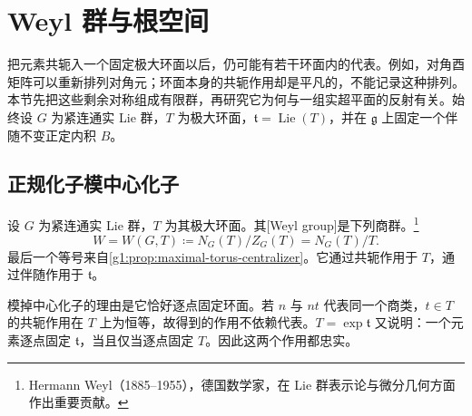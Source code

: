 
% 
% 

\section{Weyl 群与根空间}
\label{g1:sec:1904}

把元素共轭入一个固定极大环面以后，仍可能有若干环面内的代表。例如，对角酉矩阵可以重新排列对角元；环面本身的共轭作用却是平凡的，不能记录这种排列。本节先把这些剩余对称组成有限群，再研究它为何与一组实超平面的反射有关。始终设 \(G\) 为紧连通实 Lie 群，\(T\) 为极大环面，\(\mathfrak t=\operatorname{Lie}(T)\)，并在 \(\mathfrak g\) 上固定一个伴随不变正定内积 \(B\)。

\subsection{正规化子模中心化子}
\label{g1:subsec:1904:01}
\begin{definition}\label{g1:def:weyl-group}
	设 \(G\) 为紧连通实 Lie 群，\(T\) 为其极大环面。其[Weyl group]是下列商群。\footnote{Hermann Weyl（1885--1955），德国数学家，在 Lie 群表示论与微分几何方面作出重要贡献。}
	\[
		W=W(G,T)\coloneqq N_G(T)/Z_G(T)=N_G(T)/T.
	\]
	最后一个等号来自\cref{g1:prop:maximal-torus-centralizer}。它通过共轭作用于 \(T\)，通过伴随作用于 \(\mathfrak t\)。
\end{definition}

模掉中心化子的理由是它恰好逐点固定环面。若 \(n\) 与 \(nt\) 代表同一个商类，\(t\in T\) 的共轭作用在 \(T\) 上为恒等，故得到的作用不依赖代表。\(T=\exp\mathfrak t\) 又说明：一个元素逐点固定 \(\mathfrak t\)，当且仅当逐点固定 \(T\)。因此这两个作用都忠实。

